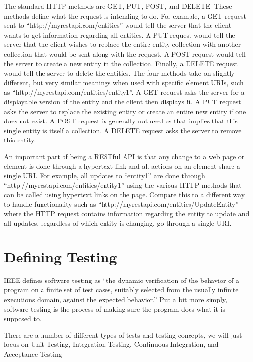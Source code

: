 \documentclass[12pt]{ucthesis}
\begin{document}
The standard HTTP methods are GET, PUT, POST, and DELETE. These methods define what the request is intending to do. For example, a GET request sent to ``http://myrestapi.com/entities'' would tell the server that the client wants to get information regarding all entities. A PUT request would tell the server that the client wishes to replace the entire entity collection with another collection that would be sent along with the request. A POST request would tell the server to create a new entity in the collection. Finally, a DELETE request would tell the server to delete the entities. The four methods take on slightly different, but very similar meanings when used with specific element URIs, such as ``http://myrestapi.com/entities/entity1''. A GET request asks the server for a displayable version of the entity and the client then displays it. A PUT request asks the server to replace the existing entity or create an entire new entity if one does not exist. A POST request is generally not used as that implies that this single entity is itself a collection. A DELETE request asks the server to remove this entity.

An important part of being a RESTful API is that any change to a web page or element is done through a hypertext link and all actions on an element share a single URI. For example, all updates to ``entity1'' are done through ``http://myrestapi.com/entities/entity1'' using the various HTTP methods that can be called using hypertext links on the page. Compare this to a different way to handle functionality such as ``http://myrestapi.com/entities/UpdateEntity'' where the HTTP request contains information regarding the entity to update and all updates, regardless of which entity is changing, go through a single URI.

\section{Defining Testing}
IEEE defines software testing as ``the dynamic verification of the behavior of a program on a finite set of test cases, suitably selected from the usually infinite executions domain, against the expected behavior.'' \cite{TestingDefinition} Put a bit more simply, software testing is the process of making sure the program does what it is supposed to.

There are a number of different types of tests and testing concepts, we will just focus on Unit Testing, Integration Testing, Continuous Integration, and Acceptance Testing.
\end{document}
